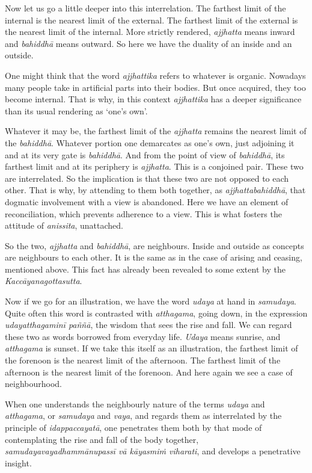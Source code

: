Now let us go a little deeper into this interrelation. The farthest limit of the internal is the nearest limit of the external. The farthest limit of the external is the nearest limit of the internal. More strictly rendered, \emph{ajjhatta} means inward and \emph{bahiddhā} means outward. So here we have the duality of an inside and an outside.

One might think that the word \emph{ajjhattika} refers to whatever is organic. Nowadays many people take in artificial parts into their bodies. But once acquired, they too become internal. That is why, in this context \emph{ajjhattika} has a deeper significance than its usual rendering as `one's own'.

Whatever it may be, the farthest limit of the \emph{ajjhatta} remains the nearest limit of the \emph{bahiddhā}. Whatever portion one demarcates as one's own, just adjoining it and at its very gate is \emph{bahiddhā}. And from the point of view of \emph{bahiddhā}, its farthest limit and at its periphery is \emph{ajjhatta}. This is a conjoined pair. These two are interrelated. So the implication is that these two are not opposed to each other. That is why, by attending to them both together, as \emph{ajjhattabahiddhā}, that dogmatic involvement with a view is abandoned. Here we have an element of reconciliation, which prevents adherence to a view. This is what fosters the attitude of \emph{anissita}, unattached.

So the two, \emph{ajjhatta} and \emph{bahiddhā}, are neighbours. Inside and outside as concepts are neighbours to each other. It is the same as in the case of arising and ceasing, mentioned above. This fact has already been revealed to some extent by the \emph{Kaccāyanagottasutta}.

Now if we go for an illustration, we have the word \emph{udaya} at hand in \emph{samudaya}. Quite often this word is contrasted with \emph{atthagama}, going down, in the expression \emph{udayatthagaminī paññā}, the wisdom that sees the rise and fall. We can regard these two as words borrowed from everyday life. \emph{Udaya} means sunrise, and \emph{atthagama} is sunset. If we take this itself as an illustration, the farthest limit of the forenoon is the nearest limit of the afternoon. The farthest limit of the afternoon is the nearest limit of the forenoon. And here again we see a case of neighbourhood.

When one understands the neighbourly nature of the terms \emph{udaya} and \emph{atthagama}, or \emph{samudaya} and \emph{vaya}, and regards them as interrelated by the principle of \emph{idappaccayatā}, one penetrates them both by that mode of contemplating the rise and fall of the body together, \emph{samudayavayadhammānupassī vā kāyasmiṁ viharati}, and develops a penetrative insight.

